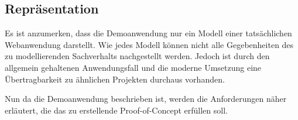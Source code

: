 \subsection{Repräsentation}

Es ist anzumerken, dass die Demoanwendung nur ein Modell einer tatsächlichen Webanwendung darstellt. Wie jedes Modell können nicht alle Gegebenheiten des zu modellierenden Sachverhalts nachgestellt werden. Jedoch ist durch den allgemein gehaltenen Anwendungsfall und die moderne Umsetzung eine Übertragbarkeit zu ähnlichen Projekten durchaus vorhanden.

Nun da die Demoanwendung beschrieben ist, werden die Anforderungen näher erläutert, die das zu erstellende Proof-of-Concept erfüllen soll.

\pagebreak